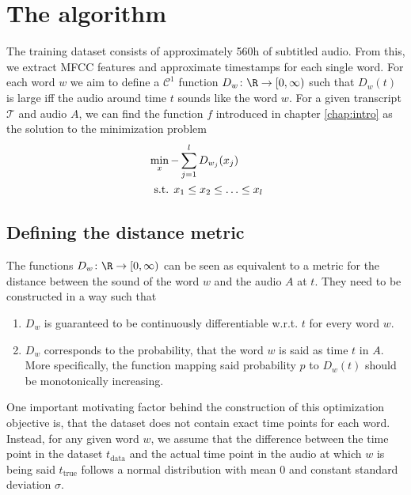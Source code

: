 \chapter{The algorithm}

The training dataset consists of approximately 560h of subtitled audio. From this, we extract MFCC features and approximate timestamps for each single word. For each word $w$ we aim to define a $\mathcal{C}^1$ function \(D_w\colon \R \to \lbrack 0, \infty)\) such that $D_w(t)$ is large iff the audio around time $t$ sounds like the word $w$. For a given transcript $\mathcal{T}$ and audio $A$, we can find the function $f$ introduced in chapter \ref{chap:intro} as the solution to the minimization problem
\begin{align*}
	&\min_x -\sum_{j=1}^l D_{w_j}(x_j)\\
	&\hspace{0.5em}\text{s.t. }x_1\leq x_2\leq \dotsc\leq x_l
\end{align*}

\section{Defining the distance metric}

The functions \(D_w\colon \R \to \lbrack 0, \infty)\) can be seen as equivalent to a metric for the distance between the sound of the word $w$ and the audio $A$ at $t$. They need to be constructed in a way such that
\begin{enumerate}
	\item $D_w$ is guaranteed to be continuously differentiable w.r.t. $t$ for every word $w$.
	\item $D_w$ corresponds to the probability, that the word $w$ is said as time $t$ in $A$. More specifically, the function mapping said probability $p$ to $D_w(t)$ should be monotonically increasing.
\end{enumerate}

One important motivating factor behind the construction of this optimization objective is, that the dataset does not contain exact time points for each word. Instead, for any given word $w$, we assume that the difference between the time point in the dataset $t_\text{data}$ and the actual time point in the audio at which $w$ is being said $t_\text{true}$ follows a normal distribution with mean $0$ and constant standard deviation $\sigma$.

